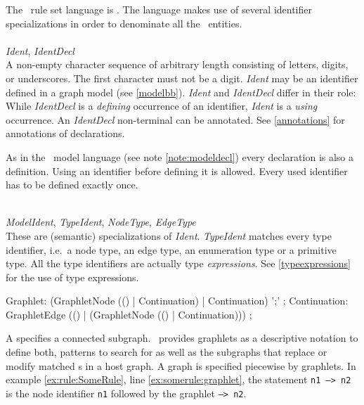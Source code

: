 The \GrG\ rule set language is . The language makes use of several identifier specializations in order to denominate all the \GrG\ entities.\\
\\
\emph{Ident}, \emph{IdentDecl}\\ \nopagebreak
A non-empty character sequence of arbitrary length consisting of letters, digits, or underscores. The first character must not be a digit. \emph{Ident} may be an identifier defined in a graph model (see \ref{modelbb}). \emph{Ident} and \emph{IdentDecl} differ in their role: While \emph{IdentDecl} is a \emph{defining} occurrence of an identifier, \emph{Ident} is a \emph{using} occurrence. An \emph{IdentDecl} non-terminal can be annotated. See \ref{annotations} for annotations of declarations.
\begin{note}
  As in the \GrG\ model language (see note \ref{note:modeldecl}) every declaration is also a definition. Using an identifier before defining it is allowed. Every used identifier has to be defined exactly once.
\end{note}
\mbox{ }\\
\emph{ModelIdent}, \emph{TypeIdent}, \emph{NodeType}, \emph{EdgeType}\\
These are (semantic) specializations of \emph{Ident}. \emph{TypeIdent} matches every type identifier, i.e.\ a node type, an edge type, an enumeration type or a primitive type. All the type identifiers are actually type \emph{expressions}. See \ref{typeexpressions} for the use of type expressions.\\

\begin{rail}
  Graphlet: (GraphletNode (() | Continuation) | Continuation) ';' ;
  Continuation: GraphletEdge (() | (GraphletNode (() | Continuation))) ;
\end{rail}
A  specifies a connected subgraph. 
\GrG\ provides graphlets as a descriptive notation to define both, patterns to search for as well as the subgraphs that replace or modify matched s in a host graph. 
A graph is specified piecewise by graphlets. 
In example \ref{ex:rule:SomeRule}, line \ref{ex:somerule:graphlet}, the statement \texttt{n1 --> n2} is the node identifier \texttt{n1} followed by the  graphlet \texttt{--> n2}.


